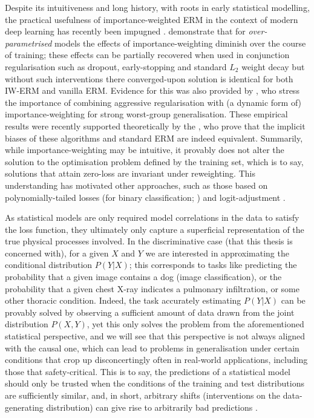 Despite its intuitiveness and long history, with roots in early statistical modelling, the
practical usefulness of importance-weighted ERM in the context of modern deep learning has recently
been impugned \citep{byrd2019effect, zhai2022understanding}.
%
\cite{byrd2019effect} demonstrate that for \emph{over-parametrised} models the effects of
importance-weighting diminish over the course of training; these effects can be partially recovered
when used in conjunction regularisation such as dropout, early-stopping and standard \(L_2\) weight
decay but without such interventions there converged-upon solution is identical for both IW-ERM and
vanilla ERM. 
%
Evidence for this was also provided by \cite{sagawa2019distributionally}, who stress the importance
of combining aggressive regularisation with (a dynamic form of) importance-weighting for
strong worst-group generalisation.
%
These empirical results were recently supported theoretically by the \cite{zhai2022understanding},
who prove that the implicit biases of these algorithms and standard ERM are indeed equivalent.
%
Summarily, while importance-weighting may be intuitive, it provably does not alter the solution to
the optimisation problem defined by the training set, which is to say, solutions that attain
zero-loss are invariant under reweighting.
%
This understanding has motivated other approaches, such as those based on polynomially-tailed
losses (for binary classification; \cite{wang2021importance}) and logit-adjustment
\citep{menon2020long}.
%

As statistical models are only required model correlations in the data to satisfy the loss
function, they ultimately only capture a superficial representation of the true physical processes
involved.
%
In the discriminative case (that this thesis is concerned with), for a given \( X \) and \( Y \) we
are interested in approximating the conditional distribution \( P(Y|X) \); this  corresponds to
tasks like predicting the probability that a given image contains a dog (image classification), or
the probability that a given chest X-ray indicates a pulmonary infiltration, or some other thoracic
condition.
%
Indeed, the task accurately estimating \( P(Y | X) \) can be provably solved by observing a
sufficient amount of \iid{} data drawn from the joint distribution \( P(X,Y) \), yet this only
solves the problem from the aforementioned statistical perspective, and we will see that this
perspective is not always aligned with the causal one, which can lead to problems in generalisation
under certain conditions that crop up disconcertingly often in real-world applications, including
those that safety-critical.
%
This is to say, the predictions of a statistical model should only be trusted when the conditions
of the training and test distributions are sufficiently similar, and, in short, arbitrary shifts
(interventions on the data-generating distribution) can give rise to arbitrarily bad predictions
\citep{pearl2009causality, scholkopf2012causal}.

